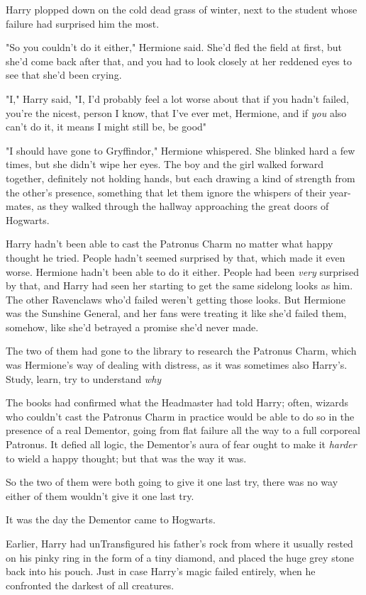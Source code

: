 Harry plopped down on the cold dead grass of winter, next to the student whose
failure had surprised him the most.

"So you couldn't do it either," Hermione said. She'd fled the field at first,
but she'd come back after that, and you had to look closely at her reddened
eyes to see that she'd been crying.

"I," Harry said, "I, I'd probably feel a lot worse about that if you hadn't
failed, you're the nicest, person I know, that I've ever met, Hermione, and if
\emph{you} also can't do it, it means I might still be, be good{\el}"

"I should have gone to Gryffindor," Hermione whispered. She blinked hard a few
times, but she didn't wipe her eyes.
\sbreak
The boy and the girl walked forward together, definitely not holding hands, but
each drawing a kind of strength from the other's presence, something that let
them ignore the whispers of their year-mates, as they walked through the
hallway approaching the great doors of Hogwarts.

Harry hadn't been able to cast the Patronus Charm no matter what happy thought
he tried. People hadn't seemed surprised by that, which made it even worse.
Hermione hadn't been able to do it either. People had been \emph{very}
surprised by that, and Harry had seen her starting to get the same sidelong
looks as him. The other Ravenclaws who'd failed weren't getting those looks.
But Hermione was the Sunshine General, and her fans were treating it like she'd
failed them, somehow, like she'd betrayed a promise she'd never made.

The two of them had gone to the library to research the Patronus Charm, which
was Hermione's way of dealing with distress, as it was sometimes also Harry's.
Study, learn, try to understand \emph{why{\el}}

The books had confirmed what the Headmaster had told Harry; often, wizards who
couldn't cast the Patronus Charm in practice would be able to do so in the
presence of a real Dementor, going from flat failure all the way to a full
corporeal Patronus. It defied all logic, the Dementor's aura of fear ought to
make it \emph{harder} to wield a happy thought; but that was the way it was.

So the two of them were both going to give it one last try, there was no way
either of them wouldn't give it one last try.

It was the day the Dementor came to Hogwarts.

Earlier, Harry had unTransfigured his father's rock from where it usually
rested on his pinky ring in the form of a tiny diamond, and placed the huge
grey stone back into his pouch. Just in case Harry's magic failed entirely,
when he confronted the darkest of all creatures.

